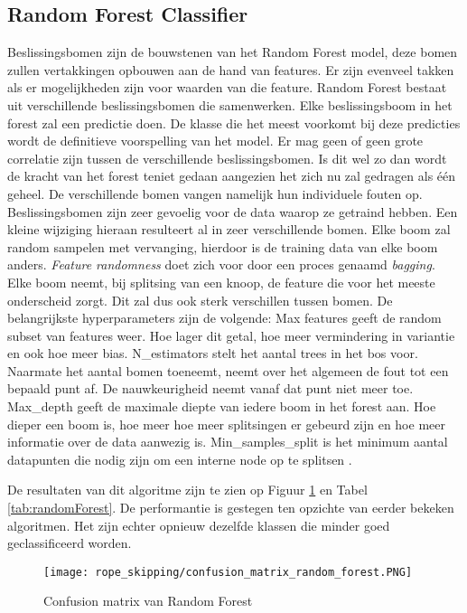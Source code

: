 \subsection{Random Forest Classifier}
Beslissingsbomen zijn de bouwstenen van het Random Forest model, deze bomen zullen vertakkingen opbouwen aan de hand van features. Er zijn evenveel takken als er mogelijkheden zijn voor waarden van die feature. Random Forest bestaat uit verschillende beslissingsbomen die samenwerken. Elke beslissingsboom in het forest zal een predictie doen. De klasse die het meest voorkomt bij deze predicties wordt de definitieve voorspelling van het model. Er mag geen of geen grote correlatie zijn tussen de verschillende beslissingsbomen. Is dit wel zo dan wordt de kracht van het forest teniet gedaan aangezien het zich nu zal gedragen als één geheel. De verschillende bomen vangen namelijk hun individuele fouten op. Beslissingsbomen zijn zeer gevoelig voor de data waarop ze getraind hebben. Een kleine wijziging hieraan resulteert al in zeer verschillende bomen. Elke boom zal random sampelen met vervanging, hierdoor is de training data van elke boom anders. \textit{Feature randomness} doet zich voor door een proces genaamd \textit{bagging}. Elke boom neemt, bij splitsing van een knoop, de feature die voor het meeste onderscheid zorgt. Dit zal dus ook sterk verschillen tussen bomen.
De belangrijkste hyperparameters zijn de volgende:
Max features geeft de random subset van features weer. Hoe lager dit getal, hoe meer vermindering in variantie en ook hoe meer bias. 
N\_estimators stelt het aantal trees in het bos voor. Naarmate het aantal bomen toeneemt, neemt over het algemeen de fout tot een bepaald punt af. De nauwkeurigheid neemt vanaf dat punt niet meer toe. 
Max\_depth geeft de maximale diepte van iedere boom in het forest aan. Hoe dieper een boom is, hoe meer hoe meer splitsingen er gebeurd zijn en hoe meer informatie over de data aanwezig is.
Min\_samples\_split is het minimum aantal datapunten die nodig zijn om een interne node op te splitsen \cite{ref35}.

De resultaten van dit algoritme zijn te zien op Figuur \ref{fig:random_forest} en Tabel \ref{tab:randomForest}. De performantie is gestegen ten opzichte van eerder bekeken algoritmen. Het zijn echter opnieuw dezelfde klassen die minder goed geclassificeerd worden.

\begin{figure}[!htpd]
\centering
\caption{Confusion matrix van Random Forest}\label{fig:random_forest}
\texttt{[image: rope\_skipping/confusion\_matrix\_random\_forest.PNG]}
\end{figure}

